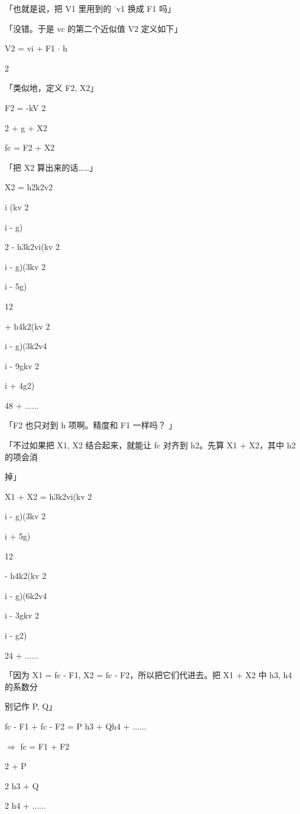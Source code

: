 「也就是说，把 V1 里用到的 ˙v1 换成 F1 吗」\par
「没错。于是 vc 的第二个近似值 V2 定义如下」\par
V2 = vi + F1 $\cdot$ h\par
2\par
「类似地，定义 F2, X2」\par
F2 = -kV 2\par
2 + g + X2\par
fc = F2 + X2\par
「把 X2 算出来的话……」\par
X2 = h2k2v2\par
i (kv 2\par
i - g)\par
2 - h3k2vi(kv 2\par
i - g)(3kv 2\par
i - 5g)\par
12\par
+ h4k2(kv 2\par
i - g)(3k2v4\par
i - 9gkv 2\par
i + 4g2)\par
48 + ......\par
「F2 也只对到 h 项啊。精度和 F1 一样吗？ 」\par
「不过如果把 X1, X2 结合起来，就能让 fc 对齐到 h2。先算 X1 + X2，其中 h2 的项会消\par
掉」\par
X1 + X2 = h3k2vi(kv 2\par
i - g)(3kv 2\par
i + 5g)\par
12\par
- h4k2(kv 2\par
i - g)(6k2v4\par
i - 3gkv 2\par
i - g2)\par
24 + ......\par
「因为 X1 = fc - F1, X2 = fc - F2，所以把它们代进去。把 X1 + X2 中 h3, h4 的系数分\par
别记作 P, Q」\par
fc - F1 + fc - F2 = P h3 + Qh4 + ......\par
$\Rightarrow$ fc = F1 + F2\par
2 + P\par
2 h3 + Q\par
2 h4 + ......\par

